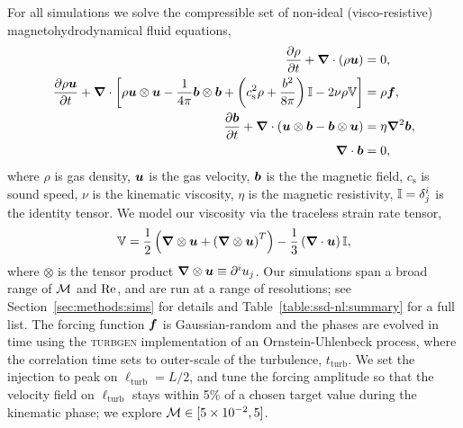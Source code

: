     For all simulations we solve the compressible set of non-ideal (visco-resistive) magnetohydrodynamical fluid equations,
    \begin{align}
        \frac{\partial \rho}{\partial t}
            + \bm{\nabla}\cdot(\rho \bm{u})
            &= 0
            , \\
        \frac{\partial \rho\bm{u}}{\partial t}
            + \bm{\nabla}\cdot\bigg[
                \rho\bm{u}\otimes\bm{u}
                - \frac{1}{4\pi}\bm{b}\otimes\bm{b}
                + \left( c_\mathrm{s}^2\rho + \frac{b^2}{8\pi} \right) \mathbb{I}
                - 2\nu\rho \mathbb{V}
            \bigg] &= \rho\bm{f}
            , \\
        \frac{\partial \bm{b}}{\partial t}
            + \bm{\nabla}\cdot\left( \bm{u}\otimes\bm{b}-\bm{b}\otimes\bm{u} \right)
            &= \eta \bm{\nabla}^2\bm{b}
            , \\
        \bm{\nabla}\cdot\bm{b}
            &= 0
            ,
    \end{align}
    where $\rho$ is gas density, $\bm{u}$ is the gas velocity, $\bm{b}$ is the the magnetic field, $c_\mathrm{s}$ is sound speed, $\nu$ is the kinematic viscosity, $\eta$ is the magnetic resistivity, $\mathbb{\bm{I}} = \delta^i_j$ is the identity tensor. We model our viscosity via the traceless strain rate tensor,
    \begin{align}
        \mathbb{V}
            = \frac{1}{2} \left( \bm{\nabla}\otimes\bm{u}
                + \left( \bm{\nabla}\otimes\bm{u} \right)^T \right)
                - \frac{1}{3} \left( \bm{\nabla}\cdot\bm{u} \right) \mathbb{\bm{I}}
            ,
    \end{align}
    where $\otimes$ is the tensor product $\bm{\nabla}\otimes\bm{u} \equiv \partial ^i u_j$. Our simulations span a broad range of $\mathcal{M}$ and $\mathrm{Re}$, and are run at a range of resolutions; see Section~\ref{sec:methods:sims} for details and Table~\ref{table:ssd-nl:summary} for a full list. The forcing function $\bm{f}$ is Gaussian-random and the phases are evolved in time using the \textsc{turbgen} implementation \citep{Federrath2022_TurbGen} of an Ornstein-Uhlenbeck process, where the correlation time sets to outer-scale of the turbulence, $t_\mathrm{turb}$. We set the injection to peak on $\ell_\mathrm{turb} = L/2$, and tune the forcing amplitude so that the velocity field on $\ell_\mathrm{turb}$ stays within 5\% of a chosen target value during the kinematic phase; we explore $\mathcal{M} \in [5\times 10^{-2}, 5]$.

